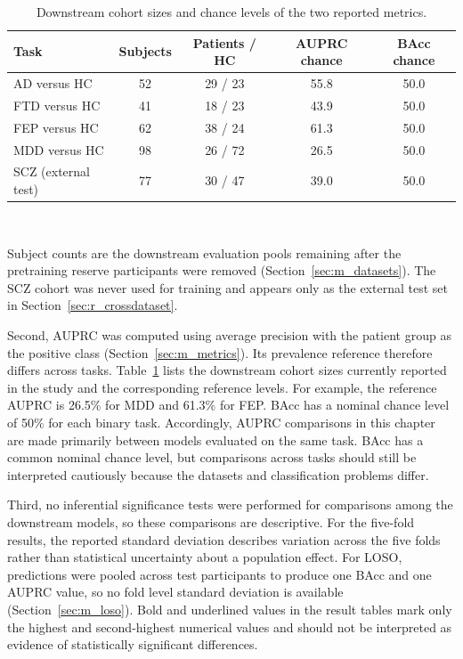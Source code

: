 \begin{table}[htbp]
  \centering
  \small
  \caption[Chance reference levels by task]{Downstream cohort sizes and chance levels of the two reported metrics.}
  \label{tab:chance_levels}
  \begin{tabular}{l c c c c}
    \toprule
    Task & Subjects & Patients / HC & AUPRC chance & BAcc chance \\
    \midrule
    AD versus HC   & 52 & 29 / 23 & 55.8 & 50.0 \\
    FTD versus HC  & 41 & 18 / 23 & 43.9 & 50.0 \\
    FEP versus HC  & 62 & 38 / 24 & 61.3 & 50.0 \\
    MDD versus HC  & 98 & 26 / 72 & 26.5 & 50.0 \\
    \midrule
    SCZ (external test) & 77 & 30 / 47 & 39.0 & 50.0 \\
    \bottomrule
  \end{tabular}
  \\[3pt]
  \begin{minipage}{0.92\linewidth}\footnotesize\raggedright
    Subject counts are the downstream evaluation pools remaining after the pretraining reserve participants were removed (Section~\ref{sec:m_datasets}). The SCZ cohort was never used for training and appears only as the external test set in Section~\ref{sec:r_crossdataset}.
  \end{minipage}
\end{table}

Second, AUPRC was computed using average precision with the patient group as
the positive class (Section~\ref{sec:m_metrics}). Its prevalence reference
therefore differs across tasks. Table~\ref{tab:chance_levels} lists the
downstream cohort sizes currently reported in the study and the corresponding
reference levels. For example, the reference AUPRC is 26.5\% for MDD and
61.3\% for FEP. BAcc has a nominal chance level of 50\% for each binary task.
Accordingly, AUPRC comparisons in this chapter are made primarily between
models evaluated on the same task. BAcc has a common nominal chance level, but
comparisons across tasks should still be interpreted cautiously because the
datasets and classification problems differ.

Third, no inferential significance tests were performed for comparisons among
the downstream models, so these comparisons are descriptive. For the
five-fold results, the reported standard deviation describes variation across
the five folds rather than statistical uncertainty about a population effect.
For LOSO, predictions were pooled across test participants to produce one BAcc
and one AUPRC value, so no fold level standard deviation is available
(Section~\ref{sec:m_loso}). Bold and underlined values in the result tables
mark only the highest and second-highest numerical values and should not be
interpreted as evidence of statistically significant differences.


